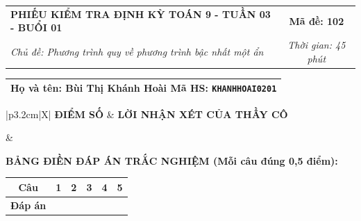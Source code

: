 \documentclass[12pt,a4paper]{article}
\begin{document}
\newpage


\noindent
\begin{tabularx}{\linewidth}{|X|c|}
\hline
\textbf{PHIẾU KIỂM TRA ĐỊNH KỲ TOÁN 9 - TUẦN 03 - BUỔI 01} & \textbf{Mã đề: 102} \\
\textit{Chủ đề: Phương trình quy về phương trình bậc nhất một ẩn} & \textit{Thời gian: 45 phút} \\
\hline
\end{tabularx}

\vspace{1mm}

\noindent
\begin{tabularx}{\linewidth}{|X|}
\hline
\rule[-2mm]{0pt}{7.5mm}\textbf{Họ và tên:} \textbf{\large Bùi Thị Khánh Hoài} \hfill \textbf{Mã HS:} \texttt{KHANHHOAI0201} \quad \\
\hline
\end{tabularx}

\vspace{1mm}

\noindent
\begin{tabularx}{\linewidth}{|p{3.2cm}|X|}
\hline
\centering\textbf{ĐIỂM SỐ} & \centering\textbf{LỜI NHẬN XÉT CỦA THẦY CÔ} \tabularnewline
\hline
\rule{0pt}{1.3cm} & \tabularnewline
\hline
\end{tabularx}

\vspace{1.2mm}

\noindent\textbf{BẢNG ĐIỀN ĐÁP ÁN TRẮC NGHIỆM (Mỗi câu đúng 0,5 điểm):}
\vspace{0.8mm}

\noindent
\renewcommand{\arraystretch}{1.35}
\begin{tabularx}{\linewidth}{|c|*{5}{>{\centering\arraybackslash}X|}}
\hline
\textbf{Câu} & \textbf{1} & \textbf{2} & \textbf{3} & \textbf{4} & \textbf{5} \\
\hline
\textbf{Đáp án} & & & & & \\
\hline
\end{tabularx}
\renewcommand{\arraystretch}{1.0}

\vspace{1.5mm}
\end{document}
